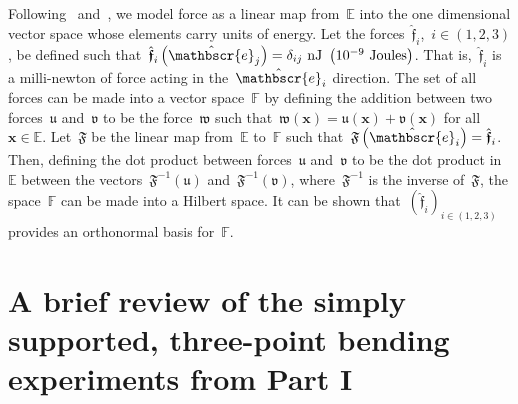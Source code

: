 \documentclass[preprint,10pt,times]{elsarticle}
\numberwithin{equation}{section}
\newcommand{\physe}{\hat{\mathbscr{e}}} %
\newcommand{\physf}{\hat{\boldsymbol{\mathfrak{f}}}}
\renewcommand{\u}[1]{\boldsymbol{#1}}
\newcommand{\pr}[1]{\left( #1 \right)}
\begin{document}
Following~\cite{masiur2019accelerometer} and~\cite{deng2020angle},
we model force as a linear map from~$\mathbb{E}$ into the one dimensional
vector space whose elements carry units of energy. Let the forces~$\physf_i$,~$i\in(1,2,3)$,
be defined such that~$\physf_i\pr{\physe_j}=\delta_{ij}~\text{nJ}~\pr{10^{-9}~\text{Joules}}$.
That is,~$\physf_i$ is a milli-newton of force acting in the~$\physe_i$
direction. The set of all forces can be made into a vector space~$\mathbb{F}$
by defining the addition between two forces~$\mathfrak{u}$ and~$\mathfrak{v}$
to be the force~$\mathfrak{w}$ such that~$\mathfrak{w}(\u{x})=\mathfrak{u}(\u{x})+\mathfrak{v}(\u{x})$
for all~$\u{x}\in\mathbb{E}$. Let~$\mathfrak{F}$ be the linear
map from~$\mathbb{E}$ to~$\mathbb{F}$ such that~$\mathfrak{F}\pr{\physe_i}=\physf_i$.
Then, defining the dot product between forces~$\mathfrak{u}$ and~$\mathfrak{v}$
to be the dot product in~$\mathbb{E}$ between the vectors~$\mathfrak{F}^{-1}(\mathfrak{u})$
and~$\mathfrak{F}^{-1}(\mathfrak{v})$, where~$\mathfrak{F}^{-1}$
is the inverse of~$\mathfrak{F}$, the space~$\mathbb{F}$ can be
made into a Hilbert space. It can be shown that~$\pr{\physf_i}_{i\in(1,2,3)}$
provides an orthonormal basis for~$\mathbb{F}$.

\section{A brief review of the simply supported, three-point bending experiments
from Part I\label{sec:experiment}}
\end{document}
